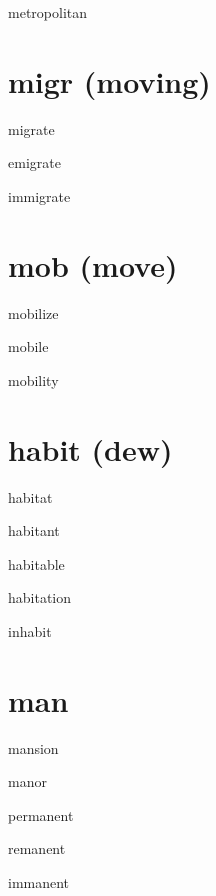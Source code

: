 \begin{RefWord}{metropolitan}
\end{RefWord}

\section{migr (moving)}

\begin{RefWord}{migrate}
\end{RefWord}

\begin{RefWord}{emigrate}
\end{RefWord}

\begin{RefWord}{immigrate}
\end{RefWord}

\section{mob (move)}

\begin{RefWord}{mobilize}
\end{RefWord}

\begin{RefWord}{mobile}
\end{RefWord}

\begin{RefWord}{mobility}
\end{RefWord}


\section{habit (dew)}

\begin{RefWord}{habitat}
\end{RefWord}

\begin{RefWord}{habitant}
\end{RefWord}

\begin{RefWord}{habitable}
\end{RefWord}

\begin{RefWord}{habitation}
\end{RefWord}

\begin{RefWord}{inhabit}
\end{RefWord}


\section{man}

\begin{RefWord}{mansion}
\end{RefWord}

\begin{RefWord}{manor}
\end{RefWord}

\begin{RefWord}{permanent}
\end{RefWord}

\begin{RefWord}{remanent}
\end{RefWord}

\begin{RefWord}{immanent}
\end{RefWord}